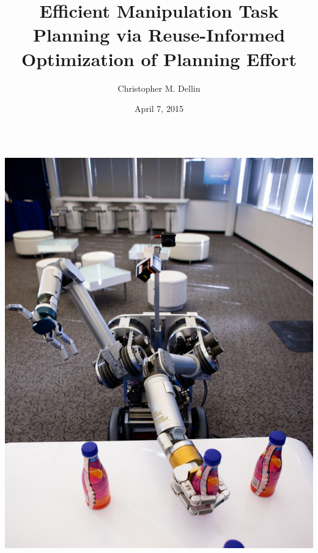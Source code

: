 \documentclass[serif]{beamer}
\title{Efficient Manipulation Task Planning via
Reuse-Informed Optimization of Planning Effort}
\author{Christopher M. Dellin}
\date{April 7, 2015}
\begin{document}

\begin{frame}[plain]
      \maketitle
\end{frame}

\begin{frame}

\the\textwidth


   \begin{columns}
   \begin{column}{0.33\textwidth}
   \begin{center}
      \includegraphics[width=\columnwidth]{images/herb.jpg}
      

\end{center}
\end{column}
\end{columns}
\end{frame}
\end{document}
